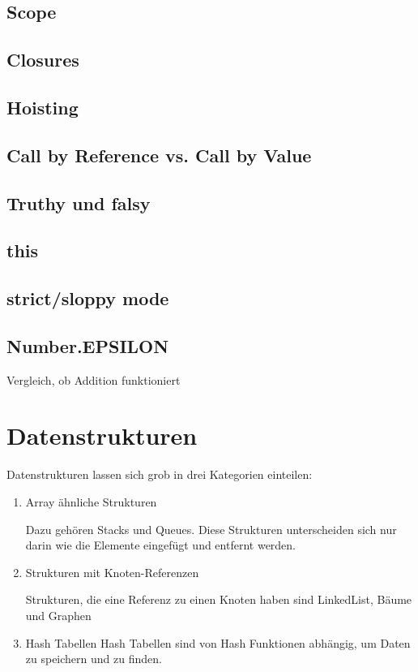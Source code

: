 \documentclass{book}
\begin{document}
\section{Scope}
\section{Closures}
\section{Hoisting}
\section{Call by Reference vs. Call by Value}
\section{Truthy und falsy}
\section{this}
\section{strict/sloppy mode}
\section{Number.EPSILON}
Vergleich, ob Addition funktioniert

\chapter{Datenstrukturen}
Datenstrukturen lassen sich grob in drei Kategorien einteilen:
\begin{enumerate} 
	\item Array ähnliche Strukturen
	
	Dazu gehören Stacks und Queues. Diese Strukturen unterscheiden sich nur darin wie die Elemente eingefügt und entfernt werden.
	\item Strukturen mit Knoten-Referenzen
	
	Strukturen, die eine Referenz zu einen Knoten haben sind LinkedList, Bäume und Graphen
	
	\item Hash Tabellen
	Hash Tabellen sind von Hash Funktionen abhängig, um Daten zu speichern und zu finden.
	
\end{enumerate}
\end{document}
